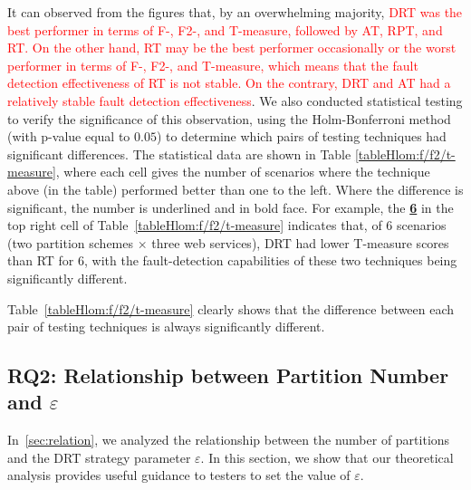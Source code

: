 \documentclass[10pt,journal,compsoc]{IEEEtran}
\begin{document}
It can observed from the figures that, by an overwhelming majority, \textcolor{red}{DRT was the best performer in terms of F-, F2-, and T-measure, followed by AT, RPT, and RT. On the other hand, RT may be the best performer occasionally or the worst performer in terms of F-, F2-, and T-measure, which means that the fault detection effectiveness of RT is not stable. On the contrary, DRT and AT had a relatively stable fault detection effectiveness}.
We also conducted statistical testing to verify the significance of this observation, using the Holm-Bonferroni method~\cite{sun2018adaptive} (with p-value equal to $0.05$) to determine which pairs of testing techniques had significant differences.
The statistical data are shown in Table \ref{tableHlom:f/f2/t-measure}, where each cell gives the number of scenarios where the technique above (in the table) performed better than one to the left.
Where the difference is significant, the number is underlined and in bold face.
For example, the \underline{\textbf{6}} in the top right cell of Table~\ref{tableHlom:f/f2/t-measure} indicates that, of 6 scenarios (two partition schemes $\times$ three web services), DRT had lower T-measure scores than RT for 6, with the fault-detection capabilities of these two techniques being significantly different.

Table~\ref{tableHlom:f/f2/t-measure} clearly shows that the difference between each pair of testing techniques is always significantly different.

\subsection{RQ2: Relationship between Partition Number and $\varepsilon$}
\label{sec:RQ2}

In~\ref{sec:relation}, we analyzed the relationship between the number of partitions and the DRT strategy parameter $\varepsilon$.
In this section, we show that our theoretical analysis provides useful guidance to testers to set the value of $\varepsilon$.
\end{document}
